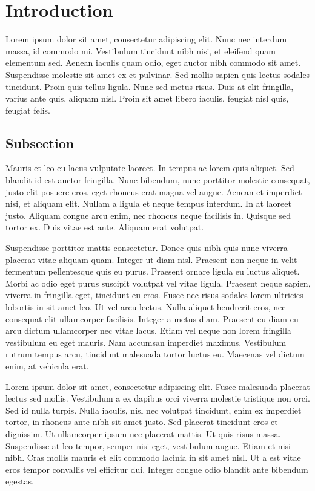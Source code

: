 \doublespacing

\section{Introduction}
\sloppy

Lorem ipsum dolor sit amet, consectetur adipiscing elit. Nunc nec interdum massa, id commodo mi. Vestibulum tincidunt nibh nisi, et eleifend quam elementum sed. Aenean iaculis quam odio, eget auctor nibh commodo sit amet. Suspendisse molestie sit amet ex et pulvinar. Sed mollis sapien quis lectus sodales tincidunt. Proin quis tellus ligula. Nunc sed metus risus. Duis at elit fringilla, varius ante quis, aliquam nisl. Proin sit amet libero iaculis, feugiat nisl quis, feugiat felis.
\subsection{Subsection}
Mauris et leo eu lacus vulputate laoreet. In tempus ac lorem quis aliquet. Sed blandit id est auctor fringilla. Nunc bibendum, nunc porttitor molestie consequat, justo elit posuere eros, eget rhoncus erat magna vel augue. Aenean et imperdiet nisi, et aliquam elit. Nullam a ligula et neque tempus interdum. In at laoreet justo. Aliquam congue arcu enim, nec rhoncus neque facilisis in. Quisque sed tortor ex. Duis vitae est ante. Aliquam erat volutpat.

Suspendisse porttitor mattis consectetur. Donec quis nibh quis nunc viverra placerat vitae aliquam quam. Integer ut diam nisl. Praesent non neque in velit fermentum pellentesque quis eu purus. Praesent ornare ligula eu luctus aliquet. Morbi ac odio eget purus suscipit volutpat vel vitae ligula. Praesent neque sapien, viverra in fringilla eget, tincidunt eu eros. Fusce nec risus sodales lorem ultricies lobortis in sit amet leo. Ut vel arcu lectus. Nulla aliquet hendrerit eros, nec consequat elit ullamcorper facilisis. Integer a metus diam. Praesent eu diam eu arcu dictum ullamcorper nec vitae lacus. Etiam vel neque non lorem fringilla vestibulum eu eget mauris. Nam accumsan imperdiet maximus. Vestibulum rutrum tempus arcu, tincidunt malesuada tortor luctus eu. Maecenas vel dictum enim, at vehicula erat.

Lorem ipsum dolor sit amet, consectetur adipiscing elit. Fusce malesuada placerat lectus sed mollis. Vestibulum a ex dapibus orci viverra molestie tristique non orci. Sed id nulla turpis. Nulla iaculis, nisl nec volutpat tincidunt, enim ex imperdiet tortor, in rhoncus ante nibh sit amet justo. Sed placerat tincidunt eros et dignissim. Ut ullamcorper ipsum nec placerat mattis. Ut quis risus massa. Suspendisse at leo tempor, semper nisi eget, vestibulum augue. Etiam et nisi nibh. Cras mollis mauris et elit commodo lacinia in sit amet nisl. Ut a est vitae eros tempor convallis vel efficitur dui. Integer congue odio blandit ante bibendum egestas.

